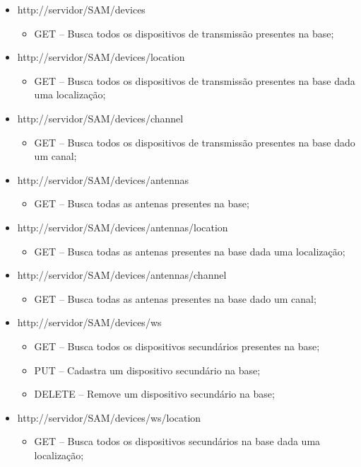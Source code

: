 \begin{itemize}
\item http://servidor/SAM/devices
\begin{itemize}
	\item GET -- Busca todos os dispositivos de transmissão presentes na base;
\end{itemize}
\item http://servidor/SAM/devices/location
\begin{itemize}
	\item GET -- Busca todos os dispositivos de transmissão presentes na base dada uma localização;
\end{itemize}
\item http://servidor/SAM/devices/channel
\begin{itemize}
	\item GET -- Busca todos os dispositivos de transmissão presentes na base dado um canal;
\end{itemize}
\item http://servidor/SAM/devices/antennas
\begin{itemize}
	\item GET -- Busca todas as antenas presentes na base;
\end{itemize}
\item http://servidor/SAM/devices/antennas/location
\begin{itemize}
	\item GET -- Busca todas as antenas presentes na base dada uma localização;
\end{itemize}
\item http://servidor/SAM/devices/antennas/channel
\begin{itemize}
	\item GET -- Busca todas as antenas presentes na base dado um canal;
\end{itemize}
\item http://servidor/SAM/devices/ws
\begin{itemize}
	\item GET -- Busca todos os dispositivos secundários presentes na base;
	\item PUT -- Cadastra um dispositivo secundário na base;
	\item DELETE -- Remove um dispositivo secundário na base;
\end{itemize}
\item http://servidor/SAM/devices/ws/location
\begin{itemize}
	\item GET -- Busca todos os dispositivos secundários na base dada uma localização;

\end{itemize}
\end{itemize}
